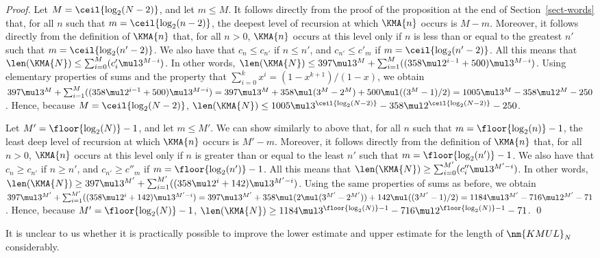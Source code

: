\documentclass{llncs}
\begin{document}
\begin{proof}
Let $M = \ceil{\log_2(N-2)}$, and let $m \leq M$.
It follows directly from the proof of the proposition at the end of 
Section~\ref{sect-words} that, for all $n$ such that 
$m = \ceil{\log_2(n-2)}$, the deepest level of recursion at which 
$\KMA{n}$ occurs is $M - m$.
Moreover, it follows directly from the definition of $\KMA{n}$ that, 
for all $n > 0$, $\KMA{n}$ occurs at this level only if $n$ is less 
than or equal to the greatest $n'$ such that $m = \ceil{\log_2(n'-2)}$.
We also have that $c_n \leq c_{n'}$ if $n \leq n'$, and 
$c_{n'} \leq c'_m$ if $m = \ceil{\log_2(n'-2)}$.
All this means that 
$\len(\KMA{N}) \leq \sum_{i=0}^M (c'_i \mul 3^{M-i})$.
In other words,
$\len(\KMA{N}) \leq 
 397 \mul 3^M + \sum_{i=1}^M ((358 \mul 2^{i-1} + 500) \mul 3^{M-i})$.
Using elementary properties of sums and the property that 
$\sum_{i=0}^k x^i = (1 - x^{k+1}) / (1-x)$, we obtain 
$397 \mul 3^M + \sum_{i=1}^M ((358 \mul 2^{i-1} + 500) \mul 3^{M-i}) =
 397 \mul 3^M + 358 \mul (3^M - 2^M) + \linebreak
 500 \mul ((3^M - 1) / 2) = 
 1005 \mul 3^M - 358 \mul 2^M - 250$.
Hence, because $M = \linebreak \ceil{\log_2(N-2)}$,
$\len(\KMA{N}) \leq 
 1005 \mul 3^\ceil{\log_2(N-2)} - 358 \mul 2^\ceil{\log_2(N-2)} - 250$.

Let $M' = \floor{\log_2(N)} - 1$, and let $m \leq M'$.
We can show similarly to above that, for all $n$ such that 
$m = \floor{\log_2(n)} - 1$, the least deep level of recursion at which 
$\KMA{n}$ occurs is $M' - m$.
Moreover, it follows directly from the definition of $\KMA{n}$ that, 
for all $n > 0$, $\KMA{n}$ occurs at this level only if $n$ is greater 
than or equal to the least $n'$ such that 
$m = \floor{\log_2(n')} - 1$.
We also have that $c_n \geq c_{n'}$ if $n \geq n'$, and 
$c_{n'} \geq c''_m$ if $m = \floor{\log_2(n')} - 1$.
All this means that 
$\len(\KMA{N}) \geq \sum_{i=0}^{M'} (c''_i \mul 3^{M'-i})$.
In other words,
$\len(\KMA{N}) \geq 
 397 \mul 3^{M'} + 
 \sum_{i=1}^{M'} ((358 \mul 2^i + 142) \mul 3^{M'-i})$.
Using the same properties of sums as before, we obtain 
$397 \mul 3^{M'} + 
 \sum_{i=1}^{M'} ((358 \mul 2^i + 142) \mul 3^{M'-i}) =
 397 \mul 3^{M'} + \linebreak 358 \mul (2 \mul (3^{M'} - 2^{M'})) + 
 142 \mul ((3^{M'} - 1) / 2) = 
 1184 \mul 3^{M'} - 716 \mul 2^{M'} - 71$. 
Hence, because $M' = \floor{\log_2(N)} - 1$,
$\len(\KMA{N}) \geq 
 1184 \mul 3^{\floor{\log_2(N)}-1} - \linebreak
 716 \mul 2^{\floor{\log_2(N)}-1} - 71$.
\qed
\end{proof}
It is unclear to us whether it is practically possible to improve the 
lower estimate and upper estimate for the length of $\nm{KMUL}_N$ 
considerably.
\end{document}
